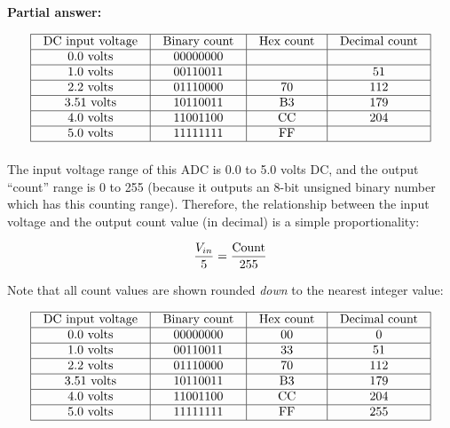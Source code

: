 





\noindent
{\bf Partial answer:}


$$\vbox{\offinterlineskip
\halign{\strut
\vrule \quad\hfil # \ \hfil & 
\vrule \quad\hfil # \ \hfil & 
\vrule \quad\hfil # \ \hfil & 
\vrule \quad\hfil # \ \hfil \vrule \cr
\noalign{\hrule}
%
DC input voltage & Binary count & Hex count & Decimal count \cr
%
\noalign{\hrule}
%
0.0 volts & 00000000 &  &  \cr
%
\noalign{\hrule}
%
1.0 volts & 00110011 & & 51 \cr
%
\noalign{\hrule}
%
2.2 volts & 01110000 & 70 & 112 \cr
%
\noalign{\hrule}
%
3.51 volts & 10110011 & B3 & 179 \cr
%
\noalign{\hrule}
%
4.0 volts & 11001100 & CC & 204 \cr
%
\noalign{\hrule}
%
5.0 volts & 11111111 & FF &  \cr
%
\noalign{\hrule}
} %
}$$ %








The input voltage range of this ADC is 0.0 to 5.0 volts DC, and the output ``count'' range is 0 to 255 (because it outputs an 8-bit unsigned binary number which has this counting range).  Therefore, the relationship between the input voltage and the output count value (in decimal) is a simple proportionality:

$${V_{in} \over 5} = {\hbox{Count} \over 255}$$

Note that all count values are shown rounded {\it down} to the nearest integer value:


$$\vbox{\offinterlineskip
\halign{\strut
\vrule \quad\hfil # \ \hfil & 
\vrule \quad\hfil # \ \hfil & 
\vrule \quad\hfil # \ \hfil & 
\vrule \quad\hfil # \ \hfil \vrule \cr
\noalign{\hrule}
%
DC input voltage & Binary count & Hex count & Decimal count \cr
%
\noalign{\hrule}
%
0.0 volts & 00000000 & 00 & 0 \cr
%
\noalign{\hrule}
%
1.0 volts & 00110011 & 33 & 51 \cr
%
\noalign{\hrule}
%
2.2 volts & 01110000 & 70 & 112 \cr
%
\noalign{\hrule}
%
3.51 volts & 10110011 & B3 & 179 \cr
%
\noalign{\hrule}
%
4.0 volts & 11001100 & CC & 204 \cr
%
\noalign{\hrule}
%
5.0 volts & 11111111 & FF & 255 \cr
%
\noalign{\hrule}
} %
}$$ %





